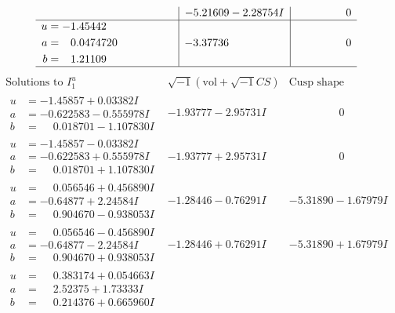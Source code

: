 \documentclass[1p]{elsarticle_modified}
\theoremstyle{definition}
\newcommand{\I}{\sqrt{-1}}
\begin{document}
$$\begin{array}{c|c|c}
 & -5.21609 - 2.28754 I & \phantom{-0.000000 } 0 \\ \hline\begin{aligned}
u &= -1.45442\phantom{ +0.000000I} \\
a &= \phantom{-}0.0474720\phantom{ +0.000000I} \\
b &= \phantom{-}1.21109\phantom{ +0.000000I}\end{aligned}
 & -3.37736\phantom{ +0.000000I} & \phantom{-0.000000 } 0\\
 \hline 
 \end{array}$$\newpage$$\begin{array}{c|c|c}  
\text{Solutions to }I^u_{1}& \I (\text{vol} + \sqrt{-1}CS) & \text{Cusp shape}\\
 \hline 
\begin{aligned}
u &= -1.45857 + 0.03382 I \\
a &= -0.622583 - 0.555978 I \\
b &= \phantom{-}0.018701 - 1.107830 I\end{aligned}
 & -1.93777 - 2.95731 I & \phantom{-0.000000 } 0 \\ \hline\begin{aligned}
u &= -1.45857 - 0.03382 I \\
a &= -0.622583 + 0.555978 I \\
b &= \phantom{-}0.018701 + 1.107830 I\end{aligned}
 & -1.93777 + 2.95731 I & \phantom{-0.000000 } 0 \\ \hline\begin{aligned}
u &= \phantom{-}0.056546 + 0.456890 I \\
a &= -0.64877 + 2.24584 I \\
b &= \phantom{-}0.904670 - 0.938053 I\end{aligned}
 & -1.28446 - 0.76291 I & -5.31890 - 1.67979 I \\ \hline\begin{aligned}
u &= \phantom{-}0.056546 - 0.456890 I \\
a &= -0.64877 - 2.24584 I \\
b &= \phantom{-}0.904670 + 0.938053 I\end{aligned}
 & -1.28446 + 0.76291 I & -5.31890 + 1.67979 I \\ \hline\begin{aligned}
u &= \phantom{-}0.383174 + 0.054663 I \\
a &= \phantom{-}2.52375 + 1.73333 I \\
b &= \phantom{-}0.214376 + 0.665960 I\end{aligned}

\end{array}$$
\end{document}
